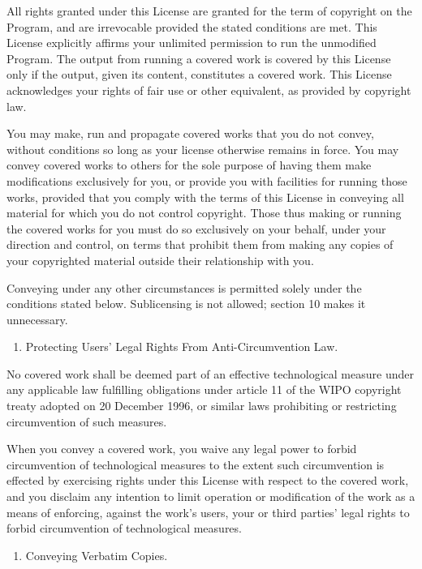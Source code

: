 \documentclass[letterpaper,10pt,english]{sphinxmanual}
\begin{document}
All rights granted under this License are granted for the term of
copyright on the Program, and are irrevocable provided the stated
conditions are met.  This License explicitly affirms your unlimited
permission to run the unmodified Program.  The output from running a
covered work is covered by this License only if the output, given its
content, constitutes a covered work.  This License acknowledges your
rights of fair use or other equivalent, as provided by copyright law.

You may make, run and propagate covered works that you do not
convey, without conditions so long as your license otherwise remains
in force.  You may convey covered works to others for the sole purpose
of having them make modifications exclusively for you, or provide you
with facilities for running those works, provided that you comply with
the terms of this License in conveying all material for which you do
not control copyright.  Those thus making or running the covered works
for you must do so exclusively on your behalf, under your direction
and control, on terms that prohibit them from making any copies of
your copyrighted material outside their relationship with you.

Conveying under any other circumstances is permitted solely under
the conditions stated below.  Sublicensing is not allowed; section 10
makes it unnecessary.
\begin{enumerate}
%
\setcounter{enumi}{2}
\item {} 
Protecting Users’ Legal Rights From Anti-Circumvention Law.

\end{enumerate}

No covered work shall be deemed part of an effective technological
measure under any applicable law fulfilling obligations under article
11 of the WIPO copyright treaty adopted on 20 December 1996, or
similar laws prohibiting or restricting circumvention of such
measures.

When you convey a covered work, you waive any legal power to forbid
circumvention of technological measures to the extent such circumvention
is effected by exercising rights under this License with respect to
the covered work, and you disclaim any intention to limit operation or
modification of the work as a means of enforcing, against the work’s
users, your or third parties’ legal rights to forbid circumvention of
technological measures.
\begin{enumerate}
%
\setcounter{enumi}{3}
\item {} 
Conveying Verbatim Copies.

\end{enumerate}
\end{document}
